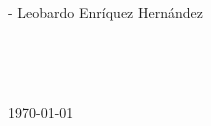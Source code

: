 \begin{titlepage}
	\begin{minipage}{0.4\textwidth}
		\begin{flushleft} \large
			\emph{}\\
- Leobardo Enríquez Hernández\\
		\end{flushleft}
	\end{minipage}
	~

	~
	
	
	{\today}\\[2cm] %
	
	

	
	
	\vfill %
	
\end{titlepage}